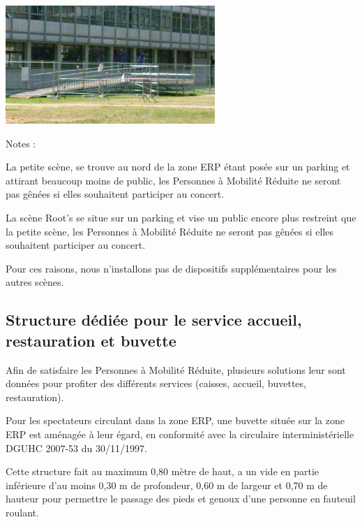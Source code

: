\documentclass[hidelinks, paper=a4, fontsize=13pt]{report}
\begin{document}
\begin{center}
\includegraphics[scale=1]{Annexes/Images/structurePMR2013}
\end{center}
Notes : 
\begin{list}{•}{}
\item La petite scène, se trouve au nord de la zone ERP étant posée sur un parking et attirant beaucoup moins de public, les Personnes à Mobilité Réduite ne seront pas gênées si elles souhaitent participer au concert.
\item La scène Root's se situe sur un parking et vise un public encore plus restreint que la petite scène, les Personnes à Mobilité Réduite ne seront pas gênées si elles souhaitent participer au concert.
\end{list}
Pour ces raisons, nous n'installons pas de dispositifs supplémentaires pour les autres scènes.


\subsection{Structure dédiée pour le service accueil, restauration et buvette}

Afin de satisfaire les Personnes à Mobilité Réduite, plusieurs solutions leur sont données pour profiter des différents services (caisses, accueil, buvettes, restauration).
\begin{list}{•}{}
\item Pour les spectateurs circulant dans la zone ERP, une buvette située sur la zone ERP est aménagée à leur égard, en conformité avec la circulaire interministérielle DGUHC 2007-53 du 30/11/1997.
\end{list}

Cette structure fait au maximum 0,80 mètre de haut, a un vide en partie inférieure d’au moins 0,30 m de profondeur, 0,60 m de largeur et 0,70 m de hauteur pour permettre le passage des pieds et genoux d’une personne en fauteuil roulant.\\
\end{document}
